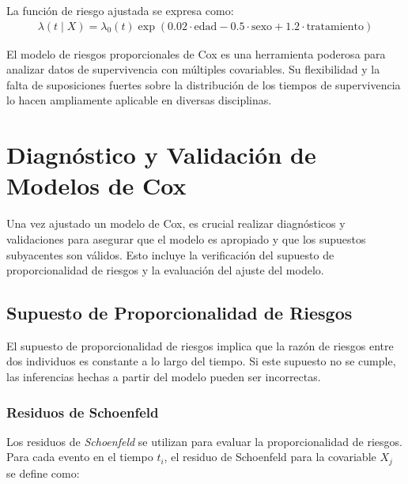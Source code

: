 \documentclass[a4paper]{report} %
\begin{document}
La funci\'on de riesgo ajustada se expresa como:
\begin{eqnarray*}
\lambda(t \mid X) = \lambda_0(t) \exp(0.02 \cdot \text{edad} - 0.5 \cdot \text{sexo} + 1.2 \cdot \text{tratamiento})
\end{eqnarray*}

El modelo de riesgos proporcionales de Cox es una herramienta poderosa para analizar datos de supervivencia con m\'ultiples covariables. Su flexibilidad y la falta de suposiciones fuertes sobre la distribuci\'on de los tiempos de supervivencia lo hacen ampliamente aplicable en diversas disciplinas.


\chapter{Diagn\'ostico y Validaci\'on de Modelos de Cox}

Una vez ajustado un modelo de Cox, es crucial realizar diagn\'osticos y validaciones para asegurar que el modelo es apropiado y que los supuestos subyacentes son v\'alidos. Esto incluye la verificaci\'on del supuesto de proporcionalidad de riesgos y la evaluaci\'on del ajuste del modelo.

\section*{Supuesto de Proporcionalidad de Riesgos}
El supuesto de proporcionalidad de riesgos implica que la raz\'on de riesgos entre dos individuos es constante a lo largo del tiempo. Si este supuesto no se cumple, las inferencias hechas a partir del modelo pueden ser incorrectas.

\subsection*{Residuos de Schoenfeld}
Los residuos de \textit{Schoenfeld} se utilizan para evaluar la proporcionalidad de riesgos. Para cada evento en el tiempo $t_i$, el residuo de Schoenfeld para la covariable $X_j$ se define como:
\end{document}

